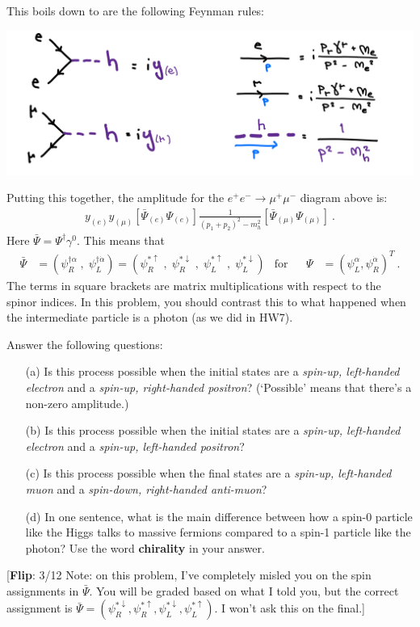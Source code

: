 \documentclass[12pt]{article}
\newcommand{\flip}[1]{{\color{red} [\textbf{Flip}: {#1}]}}
\begin{document}
This boils down to are the following Feynman rules:
\begin{center}
\includegraphics[width=.7\textwidth]{HW8bb.png}	
\end{center}

Putting this together, the amplitude for the $e^+e^-\to\mu^+\mu^-$ diagram above is:
\begin{align}
	y_{(e)} y_{(\mu)}\left[\bar\Psi_{(e)} \Psi_{(e)}\right] \frac{1}{(p_1+p_2)^2 - m_h^2} \left[\bar\Psi_{(\mu)} \Psi_{(\mu)}\right] \ .
\end{align}
Here $\bar\Psi = \Psi^\dag \gamma^0$. This means that
\begin{align}
	\bar\Psi &= (\psi_R^{\dag\alpha}\;,\; \psi_L^{\dag\dot\alpha}) 
	= ( \psi_R^{*\uparrow} \;,\;
	\psi_R^{*\downarrow} \;,\;
	\psi_L^{*\uparrow} \;,\;
	\psi_L^{*\downarrow} )
	&\text{for}
	&
	&
	\Psi &= (\psi_L^\alpha, \psi_R^{\dot\alpha})^T \ .
\end{align}
The terms in square brackets are matrix multiplications with respect to the spinor indices.
In this problem, you should contrast this to what happened when the intermediate particle is a photon (as we did in HW7).

Answer the following questions:
\begin{enumerate}
	\item[(a)] Is this process possible when the initial states are a \emph{spin-up, left-handed electron} and a \emph{spin-up, right-handed positron}? (`Possible' means that there's a non-zero amplitude.)
	\item[(b)] Is this process possible when the initial states are a \emph{spin-up, left-handed electron} and a \emph{spin-up, left-handed positron}? 
	\item[(c)] Is this process possible when the final states are a \emph{spin-up, left-handed muon} and a \emph{spin-down, right-handed anti-muon}? 
	\item[(d)] In one sentence, what is the main difference between how a spin-0 particle like the Higgs talks to massive fermions compared to a spin-1 particle like the photon? Use the word \textbf{chirality} in your answer.
\end{enumerate}
\flip{3/12 Note: on this problem, I've completely misled you on the spin assignments in $\bar\Psi$. You will be graded based on what I told you, but the correct assignment is $\bar\Psi = (\psi_R^{*\downarrow}, \psi_R^{*\uparrow}, \psi_L^{*\downarrow}, \psi_L^{*\uparrow})$. I won't ask this on the final.}
\end{document}
